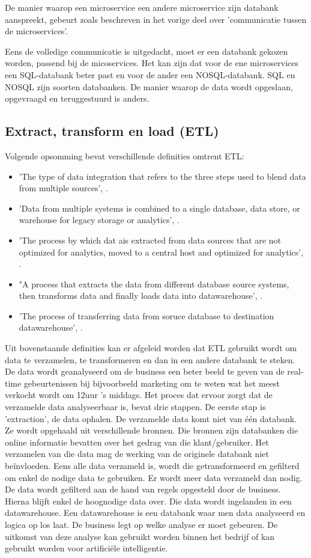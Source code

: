  De manier waarop een microservice een andere microservice zijn databank aanspreekt, gebeurt zoals beschreven in het vorige deel over 'communicatie tussen de microservices'.
 
 Eens de volledige communicatie is uitgedacht, moet er een databank gekozen worden, passend bij de micoservices. Het kan zijn dat voor de ene microservices een SQL-databank beter past en voor de ander een NOSQL-databank. SQL en NOSQL zijn soorten databanken. De manier waarop de data wordt opgeslaan, opgevraagd en teruggestuurd is anders. 
 
\subsection{Extract, transform en load (ETL)}
Volgende opsomming bevat verschillende definities omtrent ETL:
\begin{itemize}
	\item 'The type of data integration that refers to the three steps used to blend data from multiple sources', \textcite{Loshin2019}.
	\item 'Data from multiple systems is combined to a single database, data store, or warehouse for legacy storage or analytics', \textcite{Alley2018}.
	\item 'The process by which dat ais extracted from data sources that are not optimized for analytics, moved to a central host and optimized for analytics', \textcite{Stich2019}.
	\item "A process that extracts the data from different database source systems, then transforms data and finally loads data into datawarehouse', \textcite{Guru2019}.
	\item 'The process of transferring data from soruce database to destination datawarehouse', \textcite{Naveen2016}.
\end{itemize}
Uit bovenstaande definities kan er afgeleid worden dat ETL gebruikt wordt om data te verzamelen, te transformeren en dan in een andere databank te steken. De data wordt geanalyseerd om de business een beter beeld te geven van de real-time gebeurtenissen bij bijvoorbeeld marketing om te weten wat het meest verkocht wordt om 12uur 's middags. 
Het proces dat ervoor zorgt dat de verzamelde data analyseerbaar is, bevat drie stappen.
De eerste stap is 'extraction', de data ophalen. De verzamelde data komt niet van één databank. Ze wordt opgehaald uit verschillende bronnen. Die bronnen zijn databanken die online informatie bevatten over het gedrag van die klant/gebruiker. Het verzamelen van die data mag de werking van de originele databank niet beïnvloeden.
Eens alle data verzameld is, wordt die getransformeerd en gefilterd om enkel de nodige data te gebruiken. Er wordt meer data verzameld dan nodig. De data wordt gefilterd aan de hand van regels opgesteld door de business. 
Hierna blijft enkel de hoognodige data over. Die data wordt ingelanden in een datawarehouse. Een datawarehouse is een databank waar men data analyseerd en logica op los laat. De business legt op welke analyse er moet gebeuren. De uitkomst van deze analyse kan gebruikt worden binnen het bedrijf of kan gebruikt worden voor artificiële intelligentie.  

